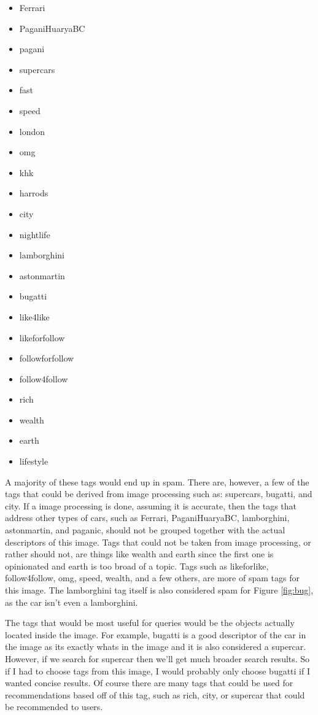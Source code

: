\documentclass[letterpaper,11pt]{article}
\begin{document}
\begin{itemize}
  \item Ferrari
  \item PaganiHuaryaBC
  \item pagani
  \item supercars
  \item fast
  \item speed
  \item london
  \item omg
  \item khk
  \item harrods
  \item city
  \item nightlife
  \item lamborghini
  \item astonmartin
  \item bugatti
  \item like4like
  \item likeforfollow
  \item followforfollow
  \item follow4follow
  \item rich
  \item wealth
  \item earth
  \item lifestyle
\end{itemize}

A majority of these tags would end up in spam.
There are, however, a few of the tags that could be derived from image processing such as: 
supercars, bugatti, and city.
If a image processing is done, assuming it is accurate, then the tags that address other types of cars, such as Ferrari, PaganiHuaryaBC, lamborghini, astonmartin, and paganic, should not be grouped together with the actual descriptors of this image.
Tags that could not be taken from image processing, or rather should not, are things like wealth and earth since the first one is opinionated and earth is too broad of a topic.
Tags such as likeforlike, follow4follow, omg, speed, wealth, and a few others, are more of spam tags for this image. 
The lamborghini tag itself is also considered spam for Figure \ref{fig:bug}, as the car isn't even a lamborghini.

The tags that would be most useful for queries would be the objects actually located inside the image.
For example, bugatti is a good descriptor of the car in the image as its exactly whats in the image and it is also considered a supercar.
However, if we search for supercar then we'll get much broader search results.
So if I had to choose tags from this image, I would probably only choose bugatti if I wanted concise results.
Of course there are many tags that could be used for recommendations based off of this tag, such as rich, city, or supercar that could be recommended to users. 
\end{document}
